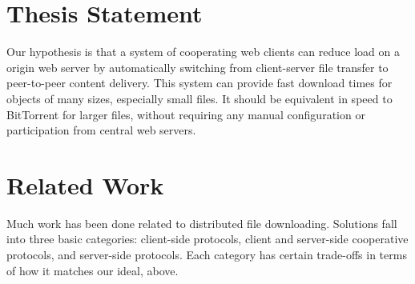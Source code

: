 {%

\section {Thesis Statement}\label{section:thesis}
Our hypothesis is that a system of cooperating web clients can reduce load on a origin web server by automatically switching from client-server file transfer to peer-to-peer content delivery.  This system can provide fast download times for objects of many sizes, especially small files.  It should be equivalent in speed to BitTorrent for larger files, without requiring any manual configuration or participation from central web servers.

\section{Related Work}\label{section:related_work}
Much work has been done related to distributed file downloading.  Solutions fall into three basic categories:  client-side protocols, client and server-side cooperative protocols, and server-side protocols.  Each category has certain trade-offs in terms of how it matches our ideal, above.

}
